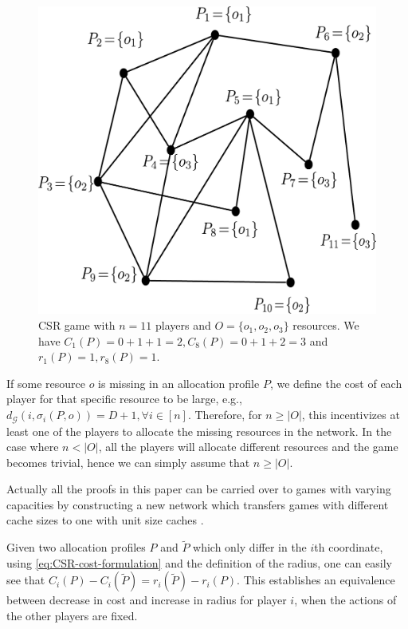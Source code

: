 \begin{figure}[htb]
\vspace{-1.5cm}
\begin{center}
\includegraphics[totalheight=.22\textheight,
width=.4\textwidth,viewport=-50 0 800 750]{example} \hspace{0.4in}
\end{center}
\vspace{-0.3cm}\caption{CSR game with $n=11$ players and $O=\{o_1,o_2,o_3\}$ resources. We have $C_1(P)=0+1+1=2, C_8(P)=0+1+2=3$ and $r_1(P)=1, r_8(P)=1$.}
\label{fig:example-model}
\end{figure}
\vspace{-0.3cm}
\begin{remark}
If some resource $o$ is missing in an allocation profile $P$, we define the cost of each player for that specific resource to be large, e.g., $d_{\mathcal{G}}(i, \sigma_i(P, o)) = D + 1, \forall i \in [n]$. Therefore, for $n \ge |O|$, this incentivizes at least one of the players to allocate the missing resources in the network. In the case where $n < |O|$, all the players will allocate different resources and the game becomes trivial, hence we can simply assume that $n \ge |O|$.
\end{remark}

\begin{remark}\label{rem:varying-cache}
Actually all the proofs in this paper can be carried over to games with varying capacities by constructing a new network which transfers games with different cache sizes to one with unit size caches \cite{etesami2014pure,gopalakrishnan2012cache}.
\end{remark}

\begin{remark}\label{rem:cost-to-radius}
Given two allocation profiles $P$ and $\tilde{P}$ which only differ in the $i$th coordinate, using \eqref{eq:CSR-cost-formulation} and the definition of the radius, one can easily see that $C_i(P)-C_i(\tilde{P})=r_i(\tilde{P})-r_i(P)$. This establishes an equivalence between decrease in cost and increase in radius for player $i$, when the actions of the other players are fixed.
\end{remark}

